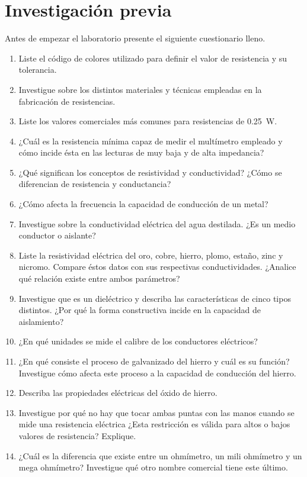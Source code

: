 \documentclass[12pt,letterpaper]{report}
\newcommand{\inv}{Investigación previa}
\newcommand{\antesde}{Antes de empezar el laboratorio presente el siguiente cuestionario lleno.}
\begin{document}
\section{\inv}
\antesde
\begin{enumerate}
\item	Liste el código de colores utilizado para definir el valor de resistencia y su tolerancia.
\item	Investigue sobre los distintos materiales y técnicas empleadas en la fabricación de resistencias.
\item Liste los valores comerciales más comunes para resistencias de \SI{0,25}{\watt}.
\item	¿Cuál es la resistencia mínima capaz de medir el multímetro empleado y cómo incide ésta en las lecturas de muy baja y de alta impedancia?
\item	¿Qué significan los conceptos de resistividad y conductividad? ¿Cómo se diferencian de resistencia y conductancia?
\item	¿Cómo afecta la frecuencia la capacidad de conducción de un metal?
\item	Investigue sobre la conductividad eléctrica del agua destilada. ¿Es un medio conductor o aislante?
\item	Liste la resistividad eléctrica del oro, cobre, hierro, plomo, estaño, zinc y nicromo. Compare éstos datos con sus respectivas conductividades. ¿Analice qué relación existe entre ambos parámetros?
\item	Investigue que es un dieléctrico y describa las características de cinco tipos distintos. ¿Por qué la forma constructiva incide en la capacidad de aislamiento?
\item	¿En qué unidades se mide el calibre de los conductores eléctricos?
\item	¿En qué consiste el proceso de galvanizado del hierro y cuál es su función? Investigue cómo afecta este proceso a la capacidad de conducción del hierro.
\item	Describa las propiedades eléctricas del óxido de hierro.
\item	Investigue por qué no hay que tocar ambas puntas con las manos cuando se mide una resistencia eléctrica ¿Esta restricción es válida para altos o bajos valores de resistencia? Explique.
\item	¿Cuál es la diferencia que existe entre un ohmímetro, un mili ohmímetro y un mega ohmímetro? Investigue qué otro nombre comercial tiene este último.
\end{enumerate}
\end{document}
